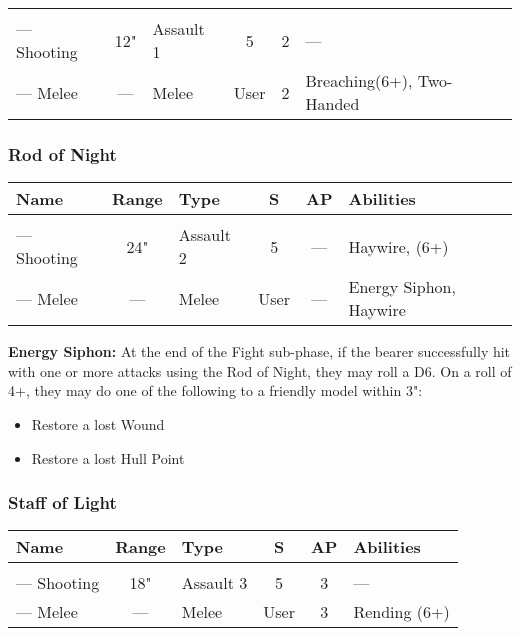 \noindent
\begin{NiceTabular}{L{115 pt} c C{40pt} *{2}{c} >{\raggedright\arraybackslash}p{240pt}}
	 &  &  &  &  & \\
	— Shooting & 12" & Assault 1 & 5 & 2 & — \\
	— Melee & — & Melee & User & 2 & Breaching(6+), Two-Handed \\
\end{NiceTabular}

\subsubsection{Rod of Night} \label{Rod of Night}
\noindent
\begin{NiceTabular}{L{115 pt} c C{40pt} *{2}{c} >{\raggedright\arraybackslash}p{240pt}}
	Name & Range & Type & S & AP & Abilities \\
	\hline
	 &  &  &  &  & \\
	— Shooting & 24" & Assault 2 & 5 & — & Haywire,  (6+) \\
	— Melee & — & Melee & User & — & Energy Siphon, Haywire \\
\end{NiceTabular}

\vspace*{1em}
\label{Energy Siphon}
\textbf{Energy Siphon:} At the end of the Fight sub-phase, if the bearer successfully hit with one or more attacks using the Rod of Night, they may roll a D6. On a roll of 4+, they may do one of the following to a friendly model within 3":
\begin{itemize}
	\item Restore a lost Wound
	\item Restore a lost Hull Point
\end{itemize}


\subsubsection{Staff of Light} \label{Staff of Light}
\noindent
\begin{NiceTabular}{L{115 pt} c C{40pt} *{2}{c} >{\raggedright\arraybackslash}p{240pt}}
	Name & Range & Type & S & AP & Abilities \\
	\hline
	 & & &  &  &  \\
	— Shooting & 18" & Assault 3 & 5 & 3 & — \\
	— Melee & — & Melee & User & 3 & Rending (6+) \\
\end{NiceTabular}

